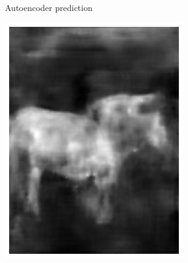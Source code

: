 \documentclass{l4proj}
\begin{document}
\begin{figure}[ht]
\begin{subfigure}[h!]{0.22\textwidth}
    \caption{Autoencoder prediction}
  \end{subfigure}
  \begin{subfigure}[h!]{0.22\textwidth}
    \includegraphics[width=\textwidth]{images/autoencoder/pony_1/unet.png}

\end{subfigure}
\end{figure}
\end{document}

